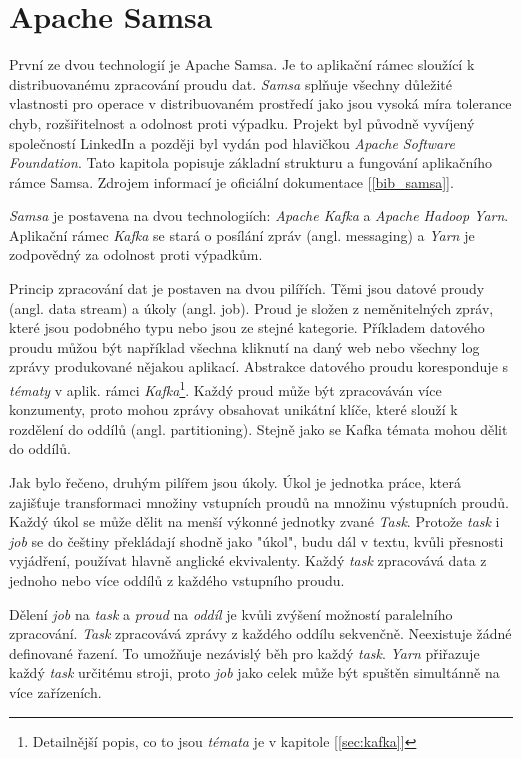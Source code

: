 \documentclass[
  digital, %
  table,   %
  nolof,     %
  nolot,     %
  oneside, %
  nocover,
  monochrome,
  12pt
]{fithesis3}
\begin{document}
\section{Apache Samsa}
První ze dvou technologií je Apache Samsa. Je to aplikační rámec sloužící k distribuovanému zpracování proudu dat. \textit{Samsa} splňuje všechny důležité vlastnosti pro operace v distribuovaném prostředí jako jsou vysoká míra tolerance chyb, rozšiřitelnost a odolnost proti výpadku. Projekt byl původně vyvíjený společností LinkedIn a později byl vydán pod hlavičkou \textit{Apache Software Foundation}. Tato kapitola popisuje základní strukturu a fungování aplikačního rámce Samsa. Zdrojem informací je oficiální dokumentace [\ref{bib_samsa}].

\textit{Samsa} je postavena na dvou technologiích: \textit{Apache Kafka} a \textit{Apache Hadoop Yarn}. Aplikační rámec \textit{Kafka} se stará o posílání zpráv (angl. messaging) a \textit{Yarn} je zodpovědný za odolnost proti výpadkům.

Princip zpracování dat je postaven na dvou pilířích. Těmi jsou datové proudy (angl. data stream) a úkoly (angl. job). Proud je složen z neměnitelných zpráv, které jsou podobného typu nebo jsou ze stejné kategorie. Příkladem datového proudu můžou být například všechna kliknutí na daný web nebo všechny log zprávy produkované nějakou aplikací. Abstrakce datového proudu koresponduje s \textit{tématy} v aplik. rámci \textit{Kafka}\footnote{Detailnější popis, co to jsou \textit{témata} je v kapitole [\ref{sec:kafka}]}. Každý proud může být zpracováván více konzumenty, proto mohou zprávy obsahovat unikátní klíče, které slouží k rozdělení do oddílů (angl. partitioning). Stejně jako se Kafka témata mohou dělit do oddílů.

Jak bylo řečeno, druhým pilířem jsou úkoly. Úkol je jednotka práce, která zajišťuje transformaci množiny vstupních proudů na množinu výstupních proudů. Každý úkol se může dělit na menší výkonné jednotky zvané \textit{Task}. Protože \textit{task} i \textit{job} se do češtiny překládají shodně jako "úkol", budu dál v textu, kvůli přesnosti vyjádření, používat hlavně anglické ekvivalenty. Každý \textit{task} zpracovává data z jednoho nebo více oddílů z každého vstupního proudu.

Dělení \textit{job} na \textit{task} a \textit{proud} na \textit{oddíl} je kvůli zvýšení možností paralelního zpracování. \textit{Task} zpracovává zprávy z každého oddílu sekvenčně. Neexistuje žádné definované řazení. To umožňuje nezávislý běh pro každý \textit{task}. \textit{Yarn} přiřazuje každý \textit{task} určitému stroji, proto \textit{job} jako celek může být spuštěn simultánně na více zařízeních.
\end{document}
